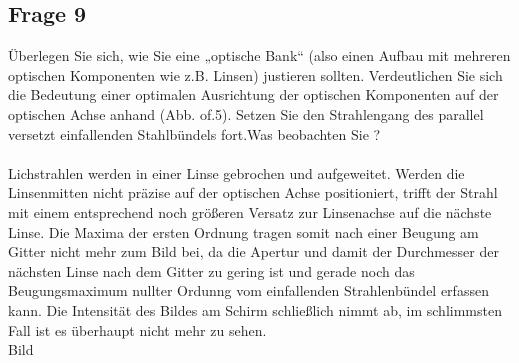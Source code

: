 \documentclass[a4paper,10pt]{scrartcl}
\begin{document}
	\subsection{Frage 9}
		Überlegen Sie sich, wie Sie eine „optische Bank“ (also einen Aufbau mit mehreren optischen Komponenten wie z.B. Linsen) justieren sollten. Verdeutlichen Sie sich die Bedeutung einer optimalen Ausrichtung der optischen Komponenten auf der optischen Achse anhand (Abb. of.5). Setzen Sie den Strahlengang des parallel versetzt einfallenden Stahlbündels fort.Was beobachten Sie ?
		\\
		\\
		Lichstrahlen werden in einer Linse gebrochen und aufgeweitet. Werden die Linsenmitten nicht präzise auf der optischen Achse positioniert, trifft der Strahl mit einem entsprechend noch größeren Versatz zur Linsenachse auf die nächste Linse. Die Maxima der ersten Ordnung tragen somit nach einer Beugung am Gitter nicht mehr zum Bild bei, da die Apertur und damit der Durchmesser der nächsten Linse nach dem Gitter zu gering ist und gerade noch das Beugungsmaximum nullter Ordunng vom einfallenden Strahlenbündel erfassen kann. Die Intensität des Bildes am Schirm schließlich nimmt ab, im schlimmsten Fall ist es überhaupt nicht mehr zu sehen.
		\\
		Bild
			
\end{document}
